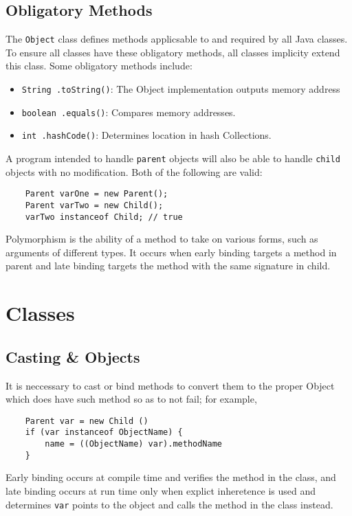 \documentclass[letterpaper, openany, justified]{tufte-book}
\newcommand{\cd}[1]{\lstinline{#1}}
\begin{document}
\begin{fullwidth}
\section{Obligatory Methods}
The \cd{Object} class defines methods applicsable to and required by all Java classes. To ensure all classes have these obligatory methods, all classes implicity extend this class. Some obligatory methods include:
\begin{itemize}
    \item \cd{String .toString()}: The Object implementation outputs memory address
    \item \cd{boolean .equals()}: Compares memory addresses.
    \item \cd{int .hashCode()}: Determines location in hash Collections.
\end{itemize}
A program intended to handle \cd{parent} objects will also be able to handle \cd{child} objects with no modification. Both of the following are valid:
\begin{lstlisting}
    Parent varOne = new Parent();
    Parent varTwo = new Child();
    varTwo instanceof Child; // true
\end{lstlisting}
Polymorphism is the ability of a method to take on various forms, such as arguments of different types. It occurs when early binding targets a method in parent and late binding targets the method with the same signature in child.

\chapter{Classes}

\section{Casting \& Objects}
It is neccessary to cast or bind methods to convert them to the proper Object which does have such method so as to not fail; for example,
\begin{lstlisting}
    Parent var = new Child ()
    if (var instanceof ObjectName) {
        name = ((ObjectName) var).methodName
    }
\end{lstlisting}
Early binding occurs at compile time and verifies the method in the class, and late binding occurs at run time only when explict inheretence is used and determines \cd{var} points to the object and calls the method in the class instead.


\end{fullwidth}
\end{document}
